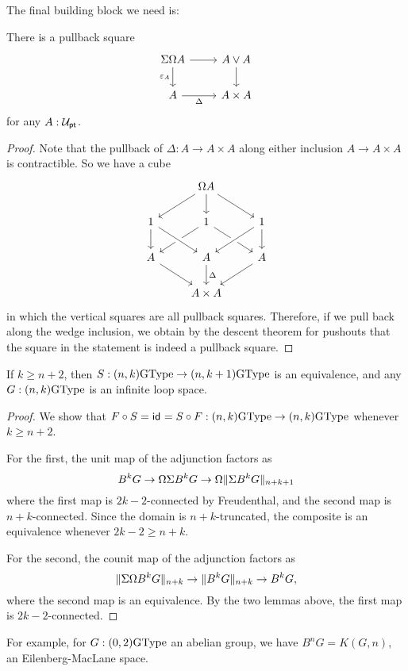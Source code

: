 The final building block we need is:
\begin{lem}
  There is a pullback square
  \[
    \begin{tikzcd}
      \susp\loopspacesym A \ar[d,"\varepsilon_A"']\ar[r] & A \vee A \ar[d] \\
      A \ar[r,"\Delta"'] & A \times A
    \end{tikzcd}
  \]
  for any $A : \UU_\pt$.
\end{lem}

\begin{proof}
Note that the pullback of $\Delta:A\to A\times A$ along either inclusion $A\to A\times A$ is contractible. So we have a cube
\begin{equation*}
\begin{tikzcd}
& \loopspacesym A \arrow[dl] \arrow[d] \arrow[dr] \\
1 \arrow[d] & 1 \arrow[dl] \arrow[dr] & 1 \arrow[dl,crossing over] \arrow[d] \\
A \arrow[dr] & A \arrow[d,"\Delta"] \arrow[from=ul,crossing over] & A \arrow[dl] \\
& A\times A
\end{tikzcd}
\end{equation*}
in which the vertical squares are all pullback squares. Therefore, if we pull back along the wedge inclusion, we obtain by the descent theorem for pushouts that the square in the statement is indeed a pullback square.
\end{proof}

\begin{thm}[Stabilization]
  \label{thm:stabilization}
  If $k\ge n+2$, then $S : (n,k)\GType \to (n,k+1)\GType$ is an
  equivalence, and any $G : (n,k)\GType$ is an infinite loop space.
\end{thm}
\begin{proof}
  We show that $F\circ S=\idfunc=S\circ F : (n,k)\GType \to (n,k)\GType$
  whenever $k\ge n+2$.

  For the first, the unit map of the adjunction factors as
  \[
    B^kG \to \loopspacesym\susp B^kG \to \loopspacesym\trunc{n+k+1}{\susp B^kG}
  \]
  where the first map is $2k-2$-connected by Freudenthal, and the
  second map is $n+k$-connected. Since the domain is $n+k$-truncated,
  the composite is an equivalence whenever $2k-2 \ge n+k$.

  For the second, the counit map of the adjunction factors as
  \[
    \trunc{n+k}{\susp\loopspacesym B^kG} \to \trunc{n+k}{B^kG} \to B^kG,
  \]
  where the second map is an equivalence. By the two lemmas above, the
  first map is $2k-2$-connected.
\end{proof}
For example, for $G : (0,2)\GType$ an abelian group, we have
$B^nG = K(G,n)$, an Eilenberg-MacLane space.

